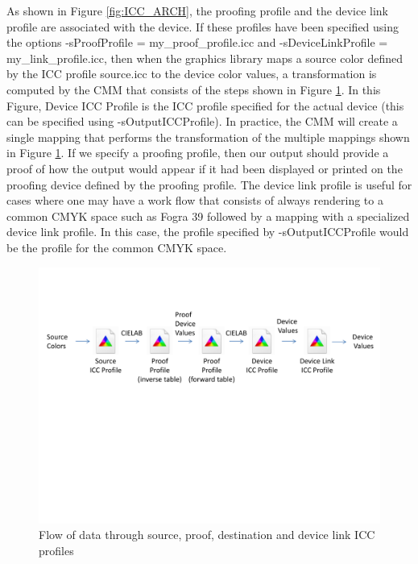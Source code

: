 \documentclass[12pt,notitlepage]{article}
\begin{document}
As shown in Figure \ref{fig:ICC_ARCH}, the proofing profile and the device link profile are associated with the device.  If these profiles have been specified using the options
-sProofProfile = my\_proof\_profile.icc and -sDeviceLinkProfile = my\_link\_profile.icc, then when the graphics library maps a source color defined by the ICC profile source.icc to the device color values, a transformation is computed by the CMM that consists of the steps shown in Figure \ref{fig:proof_link}. In this Figure, Device ICC Profile is the ICC profile specified for the actual device (this can be specified using -sOutputICCProfile).  In practice, the CMM will create a single mapping that performs the transformation of the multiple mappings shown in Figure \ref{fig:proof_link}.  If we specify a proofing profile, then our output should provide a proof of how the output would appear if it had been displayed or printed on the proofing device defined by the proofing profile.  The device link profile is useful for cases where one may have a work flow that consists of always rendering to a common CMYK space such as Fogra 39 followed by a mapping with a specialized device link profile.  In this case, the profile specified by -sOutputICCProfile would be the profile for the common CMYK space.

\begin{figure}
    \begin{center}
\includegraphics*[width=7in]{figures/proof_link.pdf}
    \end{center}
   \caption{Flow of data through source, proof, destination and device link ICC profiles}
   \label{fig:proof_link}
\end{figure}
\end{document}
